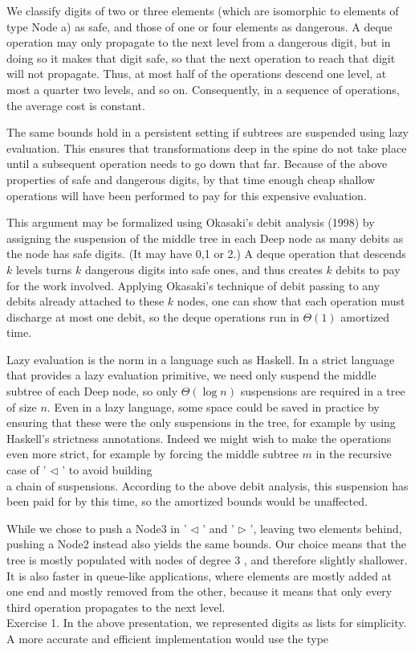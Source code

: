 \documentclass[10pt]{article}
\begin{document}
We classify digits of two or three elements (which are isomorphic to elements of type Node a) as safe, and those of one or four elements as dangerous. A deque operation may only propagate to the next level from a dangerous digit, but in doing so it makes that digit safe, so that the next operation to reach that digit will not propagate. Thus, at most half of the operations descend one level, at most a quarter two levels, and so on. Consequently, in a sequence of operations, the average cost is constant.

The same bounds hold in a persistent setting if subtrees are suspended using lazy evaluation. This ensures that transformations deep in the spine do not take place until a subsequent operation needs to go down that far. Because of the above properties of safe and dangerous digits, by that time enough cheap shallow operations will have been performed to pay for this expensive evaluation.

This argument may be formalized using Okasaki's debit analysis (1998) by assigning the suspension of the middle tree in each Deep node as many debits as the node has safe digits. (It may have 0,1 or 2.) A deque operation that descends $k$ levels turns $k$ dangerous digits into safe ones, and thus creates $k$ debits to pay for the work involved. Applying Okasaki's technique of debit passing to any debits already attached to these $k$ nodes, one can show that each operation must discharge at most one debit, so the deque operations run in $\Theta(1)$ amortized time.

Lazy evaluation is the norm in a language such as Haskell. In a strict language that provides a lazy evaluation primitive, we need only suspend the middle subtree of each Deep node, so only $\Theta(\log n)$ suspensions are required in a tree of size $n$. Even in a lazy language, some space could be saved in practice by ensuring that these were the only suspensions in the tree, for example by using Haskell's strictness annotations. Indeed we might wish to make the operations even more strict, for example by forcing the middle subtree $m$ in the recursive case of ' $\triangleleft$ ' to avoid building\\
a chain of suspensions. According to the above debit analysis, this suspension has been paid for by this time, so the amortized bounds would be unaffected.

While we chose to push a Node3 in ' $\triangleleft$ ' and ' $\triangleright$ ', leaving two elements behind, pushing a Node2 instead also yields the same bounds. Our choice means that the tree is mostly populated with nodes of degree 3 , and therefore slightly shallower. It is also faster in queue-like applications, where elements are mostly added at one end and mostly removed from the other, because it means that only every third operation propagates to the next level.\\
Exercise 1. In the above presentation, we represented digits as lists for simplicity. A more accurate and efficient implementation would use the type
\end{document}
